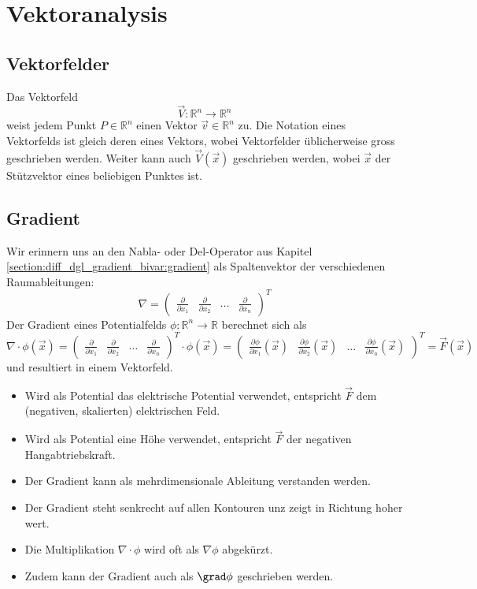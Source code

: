 \section{Vektoranalysis}

\subsection{Vektorfelder}
Das Vektorfeld \[\vec{V}:\mathbb{R}^n \rightarrow \mathbb{R}^n\] weist jedem Punkt $P \in \mathbb{R}^n$ einen Vektor $\vec{v} \in \mathbb{R}^n$ zu.
Die Notation eines Vektorfelds ist gleich deren eines Vektors, wobei Vektorfelder üblicherweise gross geschrieben werden.
Weiter kann auch $\vec{V}(\vec{x})$ geschrieben werden, wobei $\vec{x}$ der Stützvektor eines beliebigen Punktes ist.

\subsection{Gradient}
Wir erinnern uns an den Nabla- oder Del-Operator aus Kapitel \ref{section:diff_dgl_gradient_bivar:gradient} als Spaltenvektor der verschiedenen Raumableitungen:
\[
    \nabla 
    = \begin{pmatrix} \frac{\partial}{\partial x_1} & \frac{\partial}{\partial x_2} & \dots & \frac{\partial}{\partial x_n} \end{pmatrix}^T
\]
Der Gradient eines Potentialfelds $\phi: \mathbb{R}^n \to \mathbb{R}$ berechnet sich als 
\[
    \nabla \cdot \phi(\vec{x}) 
    = \begin{pmatrix} \frac{\partial}{\partial x_1} & \frac{\partial}{\partial x_2} & \dots & \frac{\partial}{\partial x_n} \end{pmatrix}^T \cdot \phi(\vec{x}) 
    = \begin{pmatrix} \frac{\partial \phi}{\partial x_1}(\vec{x}) & \frac{\partial \phi}{\partial x_2}(\vec{x}) & \dots & \frac{\partial \phi}{\partial x_n}(\vec{x}) \end{pmatrix}^T 
    = \vec{F}(\vec{x})
\]
und resultiert in einem Vektorfeld.
\begin{itemize}
    \item Wird als Potential das elektrische Potential verwendet, entspricht $\vec{F}$ dem (negativen, skalierten) elektrischen Feld.
    \item Wird als Potential eine Höhe verwendet, entspricht $\vec{F}$ der negativen Hangabtriebskraft.
    \item Der Gradient kann als mehrdimensionale Ableitung verstanden werden.
    \item Der Gradient steht senkrecht auf allen Kontouren unz zeigt in Richtung hoher wert.
    \item Die Multiplikation $\nabla \cdot \phi$ wird oft als $\nabla \phi$ abgekürzt.
    \item Zudem kann der Gradient auch als $\grad \phi$ geschrieben werden.
\end{itemize}

